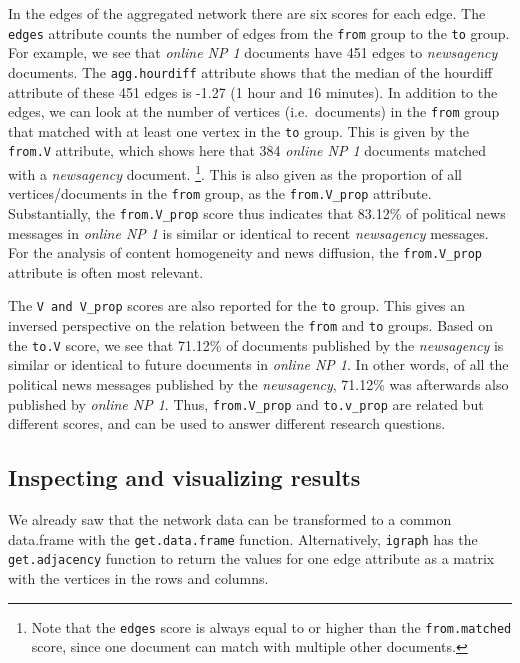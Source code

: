 In the edges of the aggregated network there are six scores for each
edge. The \texttt{edges} attribute counts the number of edges from the
\texttt{from} group to the \texttt{to} group. For example, we see that
\emph{online NP 1} documents have 451 edges to \emph{newsagency}
documents. The \texttt{agg.hourdiff} attribute shows that the median of
the hourdiff attribute of these 451 edges is -1.27 (1 hour and 16
minutes). In addition to the edges, we can look at the number of
vertices (i.e.~documents) in the \texttt{from} group that matched with
at least one vertex in the \texttt{to} group. This is given by the
\texttt{from.V} attribute, which shows here that 384 \emph{online NP 1}
documents matched with a \emph{newsagency} document. \footnote{Note that
  the \texttt{edges} score is always equal to or higher than the
  \texttt{from.matched} score, since one document can match with
  multiple other documents.}. This is also given as the proportion of
all vertices/documents in the \texttt{from} group, as the
\texttt{from.V\_prop} attribute. Substantially, the
\texttt{from.V\_prop} score thus indicates that 83.12\% of political
news messages in \emph{online NP 1} is similar or identical to recent
\emph{newsagency} messages. For the analysis of content homogeneity and
news diffusion, the \texttt{from.V\_prop} attribute is often most
relevant.

The \texttt{V\textquotesingle{} and \textquotesingle{}V\_prop} scores
are also reported for the \texttt{to} group. This gives an inversed
perspective on the relation between the \texttt{from} and \texttt{to}
groups. Based on the \texttt{to.V} score, we see that 71.12\% of
documents published by the \emph{newsagency} is similar or identical to
future documents in \emph{online NP 1}. In other words, of all the
political news messages published by the \emph{newsagency}, 71.12\% was
afterwards also published by \emph{online NP 1}. Thus,
\texttt{from.V\_prop} and \texttt{to.v\_prop} are related but different
scores, and can be used to answer different research questions.

\subsection{Inspecting and visualizing
results}\label{inspecting-and-visualizing-results}

We already saw that the network data can be transformed to a common
data.frame with the \texttt{get.data.frame} function. Alternatively,
\texttt{igraph} has the \texttt{get.adjacency} function to return the
values for one edge attribute as a matrix with the vertices in the rows
and columns.

